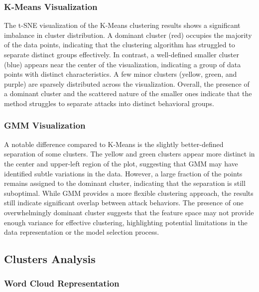         \subsubsection{K-Means Visualization \\}

        The t-SNE visualization of the K-Means clustering results shows a significant imbalance in cluster distribution. A dominant cluster (red) occupies the majority of the data points, indicating that the clustering algorithm has struggled to separate distinct groups effectively. In contrast, a well-defined smaller cluster (blue) appears near the center of the visualization, indicating a group of data points with distinct characteristics. A few minor clusters (yellow, green, and purple) are sparsely distributed across the visualization. Overall, the presence of a dominant cluster and the scattered nature of the smaller ones indicate that the method struggles to separate attacks into distinct behavioral groups.
        
        \subsubsection{GMM Visualization \\}
        
        A notable difference compared to K-Means is the slightly better-defined separation of some clusters. The yellow and green clusters appear more distinct in the center and upper-left region of the plot, suggesting that GMM may have identified subtle variations in the data. However, a large fraction of the points remains assigned to the dominant cluster, indicating that the separation is still suboptimal. While GMM provides a more flexible clustering approach, the results still indicate significant overlap between attack behaviors. The presence of one overwhelmingly dominant cluster suggests that the feature space may not provide enough variance for effective clustering, highlighting potential limitations in the data representation or the model selection process.
    
    \subsection{Clusters Analysis}

        \subsubsection{Word Cloud Representation \\}


